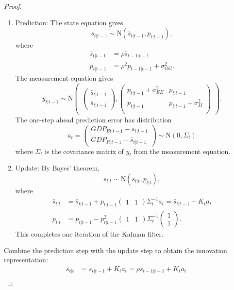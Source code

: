\documentclass[oneside,reqno]{amsart}
\newcommand{\N}{\mathrm N}
\theoremstyle{definition}
\begin{document}
\begin{enumerate}[label=(\roman*)]
\begin{proof}
\begin{enumerate}[label=(\arabic*)]
\item
Prediction: The state equation gives
\[
	s_{t|t-1} \sim \N(\bar s_{t|t-1}, p_{t|t-1}),
\]
where
\begin{align*}
	\bar s_{t|t-1} &= \rho \bar s_{t-1|t-1} \\
	p_{t|t-1} &= \rho^2 p_{t-1|t-1} + \sigma_{GG}^2.
\end{align*}
The measurement equation gives
\[
	y_{t|t-1} \sim \N \begin{pmatrix}
		\begin{pmatrix}
			\bar s_{t|t-1} \\
			\bar s_{t|t-1} 
		\end{pmatrix},
		\begin{pmatrix}
			p_{t|t-1} + \sigma_{EE}^2 & p_{t|t-1} \\
			p_{t|t-1}  & p_{t|t-1} + \sigma_{II}^2 \\
		\end{pmatrix}
	\end{pmatrix}.
\]
The one-step ahead prediction error has distribution 
\[
	a_t = \begin{pmatrix}
		GDP_{Et|t-1} - \bar s_{t|t-1}\\
		GDP_{It|t-1} -\bar s_{t|t-1}
	\end{pmatrix} 
	\sim \N(0, \Sigma_t)
\]
where $\Sigma_t$ is the covariance matrix of $y_t$ from the measurement equation. 
\item
Update: By Bayes' theorem,
\[
	s_{t|t} \sim \N(\bar s_{t|t}, p_{t|t}),
\]
where 
\begin{align*}
	\bar s_{t|t} &= \bar s_{t|t-1} + p_{t|t-1} \begin{pmatrix} 1 & 1 \end{pmatrix} \Sigma_t^{-1} a_t 
		= \bar s_{t|t-1} + K_t a_t \\
	p_{t|t} &= p_{t|t-1} - p_{t|t-1}^2 \begin{pmatrix} 1 & 1 \end{pmatrix}  \Sigma_t^{-1} \begin{pmatrix} 1 \\ 1 \end{pmatrix}.
\end{align*}
This completes one iteration of the Kalman filter.
\end{enumerate}
Combine the prediction step with the update step to obtain the innovation representation:
\begin{align*}
	\bar s_{t|t} &=  \bar s_{t|t-1} + K_t a_t = \rho \bar s_{t-1|t-1} + K_t a_t \\

\end{align*}
\end{proof}
\end{enumerate}
\end{document}
